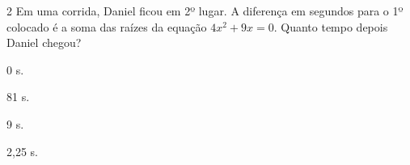 




















\num{2} Em uma corrida, Daniel
ficou em 2º lugar. A diferença em segundos para o 1º colocado
é a soma das raízes da equação $4x^2 + 9x = 0$. Quanto tempo depois
Daniel chegou?

\begin{escolha}[itemsep=0pt]
\item 0 s.
\item 81 s.
\item 9 s.
\item 2,25 s.
\end{escolha}

